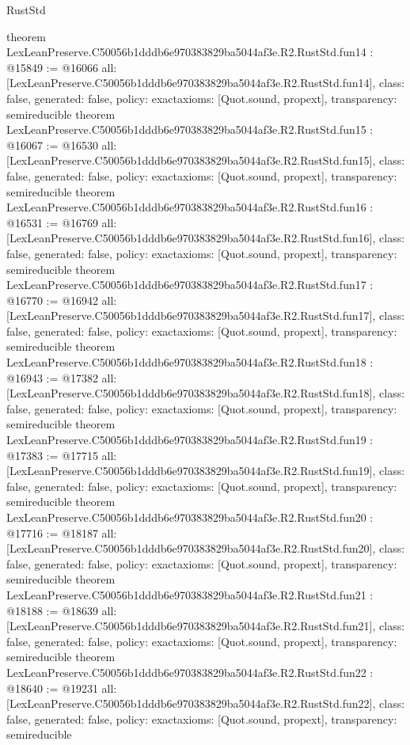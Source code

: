 \begin{lexlean}{RustStd}
\begin{coremodule}
{}
theorem LexLeanPreserve.C50056b1dddb6e970383829ba5044af3e.R2.RustStd.fun14 : @15849 := @16066 {
  all: [LexLeanPreserve.C50056b1dddb6e970383829ba5044af3e.R2.RustStd.fun14],
  class: false,
  generated: false,
  policy: exact{axioms: [Quot.sound, propext]},
  transparency: semireducible
}
theorem LexLeanPreserve.C50056b1dddb6e970383829ba5044af3e.R2.RustStd.fun15 : @16067 := @16530 {
  all: [LexLeanPreserve.C50056b1dddb6e970383829ba5044af3e.R2.RustStd.fun15],
  class: false,
  generated: false,
  policy: exact{axioms: [Quot.sound, propext]},
  transparency: semireducible
}
theorem LexLeanPreserve.C50056b1dddb6e970383829ba5044af3e.R2.RustStd.fun16 : @16531 := @16769 {
  all: [LexLeanPreserve.C50056b1dddb6e970383829ba5044af3e.R2.RustStd.fun16],
  class: false,
  generated: false,
  policy: exact{axioms: [Quot.sound, propext]},
  transparency: semireducible
}
theorem LexLeanPreserve.C50056b1dddb6e970383829ba5044af3e.R2.RustStd.fun17 : @16770 := @16942 {
  all: [LexLeanPreserve.C50056b1dddb6e970383829ba5044af3e.R2.RustStd.fun17],
  class: false,
  generated: false,
  policy: exact{axioms: [Quot.sound, propext]},
  transparency: semireducible
}
theorem LexLeanPreserve.C50056b1dddb6e970383829ba5044af3e.R2.RustStd.fun18 : @16943 := @17382 {
  all: [LexLeanPreserve.C50056b1dddb6e970383829ba5044af3e.R2.RustStd.fun18],
  class: false,
  generated: false,
  policy: exact{axioms: [Quot.sound, propext]},
  transparency: semireducible
}
theorem LexLeanPreserve.C50056b1dddb6e970383829ba5044af3e.R2.RustStd.fun19 : @17383 := @17715 {
  all: [LexLeanPreserve.C50056b1dddb6e970383829ba5044af3e.R2.RustStd.fun19],
  class: false,
  generated: false,
  policy: exact{axioms: [Quot.sound, propext]},
  transparency: semireducible
}
theorem LexLeanPreserve.C50056b1dddb6e970383829ba5044af3e.R2.RustStd.fun20 : @17716 := @18187 {
  all: [LexLeanPreserve.C50056b1dddb6e970383829ba5044af3e.R2.RustStd.fun20],
  class: false,
  generated: false,
  policy: exact{axioms: [Quot.sound, propext]},
  transparency: semireducible
}
theorem LexLeanPreserve.C50056b1dddb6e970383829ba5044af3e.R2.RustStd.fun21 : @18188 := @18639 {
  all: [LexLeanPreserve.C50056b1dddb6e970383829ba5044af3e.R2.RustStd.fun21],
  class: false,
  generated: false,
  policy: exact{axioms: [Quot.sound, propext]},
  transparency: semireducible
}
theorem LexLeanPreserve.C50056b1dddb6e970383829ba5044af3e.R2.RustStd.fun22 : @18640 := @19231 {
  all: [LexLeanPreserve.C50056b1dddb6e970383829ba5044af3e.R2.RustStd.fun22],
  class: false,
  generated: false,
  policy: exact{axioms: [Quot.sound, propext]},
  transparency: semireducible
}
\end{coremodule}
\end{lexlean}
